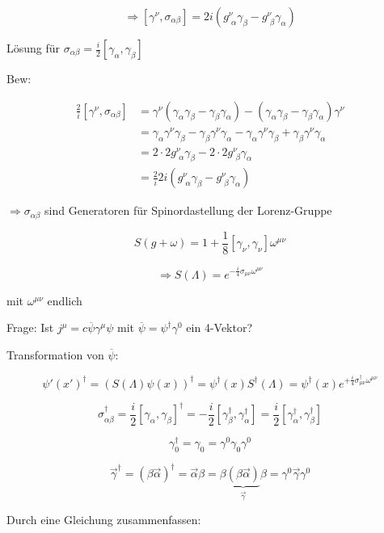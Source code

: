 \[\Rightarrow \boxed{[\gamma^\nu,\sigma_{\alpha\beta}] = 2i(g^{\nu}_{\,\,\alpha}\gamma_\beta -g^{\nu}_{\,\,\beta}\gamma_\alpha)  }\]


Lösung für \(\sigma_{\alpha\beta} = \frac{i}{2}[\gamma_\alpha,\gamma_\beta]\)

Bew: 

\begin{align}
\frac{2}{i}[\gamma^\nu,\sigma_{\alpha\beta}] &= \gamma^\nu(\gamma_\alpha\gamma_\beta - \gamma_\beta\gamma_\alpha)-(\gamma_\alpha\gamma_\beta-\gamma_\beta\gamma_\alpha)\gamma^\nu \\
&=\gamma_\alpha\gamma^\nu\gamma_\beta - \gamma_\beta\gamma^\nu\gamma_\alpha-\gamma_\alpha\gamma^\nu\gamma_\beta + \gamma_\beta\gamma^\nu\gamma_\alpha \\
&= 2\cdot 2 g^\nu_{\,\,\alpha}\gamma_\beta - 2\cdot 2 g^\nu_{\,\,\beta}\gamma_\alpha \\
&= \frac{2}{i}2i(g^\nu_{\,\,\alpha}\gamma_\beta - g^\nu_{\,\,\beta}\gamma_\alpha)
 \end{align}

\(\Rightarrow \sigma_{\alpha\beta}\) sind Generatoren für Spinordastellung der Lorenz-Gruppe

\[S(g+\omega) = 1+\frac{1}{8}[\gamma_\nu,\gamma_\nu]\omega^{\mu\nu}\]

\[\Rightarrow S(\Lambda) = e^{-\frac{i}{4}\sigma_{\mu\nu}\omega^{\mu\nu}}\]

mit \(\omega^{\mu\nu}\) endlich

Frage: Ist \(j^\mu = c\overline \psi \gamma^\mu \psi\) mit \(\overline\psi =\psi^\dagger\gamma^0\) ein 4-Vektor?


Transformation von \(\overline \psi\):

\[\psi'(x')^\dagger = (S(\Lambda)\psi(x))^\dagger = \psi^\dagger(x) S^\dagger(\Lambda) = \psi^\dagger(x)e^{+\frac{i}{4}\sigma^\dagger_{\mu\nu}\omega^{\mu\nu}}\]

\[\sigma^\dagger_{\alpha\beta} = \frac{i}{2}[\gamma_\alpha,\gamma_\beta]^\dagger = -\frac{i}{2} [\gamma_\beta^\dagger,\gamma_\alpha^\dagger] = \frac{i}{2}[\gamma_\alpha^\dagger,\gamma_\beta^\dagger] \]


\[\gamma^\dagger_0 = \gamma_0 = \gamma^0\gamma_0\gamma^0\]

\[\vec \gamma^\dagger = (\beta\vec\alpha)^\dagger = \vec\alpha\beta = \beta\underbrace{(\beta\vec\alpha)}_{\vec\gamma}\beta=\gamma^0\vec\gamma\gamma^0\]


Durch eine Gleichung zusammenfassen:

